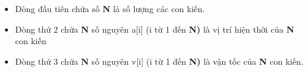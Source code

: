 \begin{itemize}
	\item Dòng đầu tiên chứa số \textbf{ N } là số lượng các con kiến.
	\item Dòng thứ 2 chứa \textbf{ N } số nguyên a[i] (i từ 1 đến \textbf{ N) } là vị trí hiện thời của \textbf{ N } con kiến
	\item Dòng thứ 3 chứa \textbf{ N } số nguyên v[i] (i từ 1 đến \textbf{ N) } là vận tốc của \textbf{ N } con kiến.
\end{itemize}